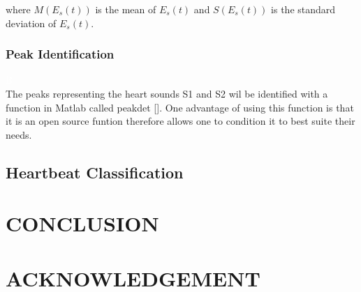 \documentclass[10pt,twocolumn]{witseiepaper}
\begin{document}
 where \(M(E_s(t))\) is the mean of \(E_s(t)\) and \(S(E_s(t))\) is the standard deviation of \(E_s(t)\).
 
 \subsubsection{Peak Identification}
\textcolor{white}{B} \\ 
 The peaks representing the heart sounds S1 and S2 wil be identified with a function in Matlab called peakdet []. One advantage of using this function is that it is an open source funtion therefore allows one to condition it to best suite their needs. 
\subsection{Heartbeat Classification}
%
\section{CONCLUSION}



%
\section*{ACKNOWLEDGEMENT}



%



\end{document}
